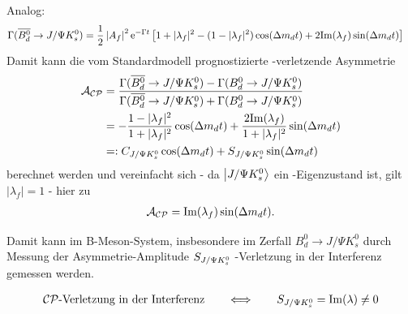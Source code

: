 Analog:
\begin{align}
\Gamma (\text{$\overline{B_d^0}$} \rightarrow J/\Psi K_s^0) &= \frac{1}{2} \left|A_f\right|^2\mathrm{e}^{-\Gamma t} \left[1+|\lambda_f|^2 -(1-|\lambda_f|^2)\cos(\Delta m_d t) + 2\mathrm{Im}(\lambda_f)\sin(\Delta m_d t)\right] \label{eq:bdbar}
\end{align}
Damit kann die vom Standardmodell prognostizierte \CP-verletzende Asymmetrie 
\begin{align}
\mathcal{A}_{\text{$\mathcal{CP}$}} &= \frac{\Gamma (\text{$\overline{B_d^0}$} \rightarrow J/\Psi K_s^0) - \Gamma (\text{$B_d^0$} \rightarrow J/\Psi K_s^0)}{\Gamma (\text{$\overline{B_d^0}$} \rightarrow J/\Psi K_s^0) + \Gamma (\text{$B_d^0$} \rightarrow J/\Psi K_s^0)} \\
&= -\frac{1-|\lambda_f|^2}{1+|\lambda_f|^2}\cos(\Delta m_d t) + \frac{2\mathrm{Im}(\lambda_f)}{1+|\lambda_f|^2}\sin(\Delta m_d t) \\
&=: C_{J/\Psi K_s^0} \cos(\Delta m_d t) + S_{J/\Psi K_s^0} \sin(\Delta m_d t) \label{eq:cp_asymm}
\end{align}
berechnet werden und vereinfacht sich - da $\Ket{J/\Psi K_s^0}$ ein \CP-Eigenzustand ist, gilt $|\lambda_f| = 1$ - hier zu
\begin{align}
\mathcal{A}_{\text{$\mathcal{CP}$}} = \mathrm{Im}(\lambda_f)\sin(\Delta m_d t) .
\end{align}

Damit kann im B-Meson-System, insbesondere im Zerfall $B_d^0 \rightarrow J/\Psi K_s^0$ durch Messung der Asymmetrie-Amplitude $S_{J/\Psi K_s^0}$ \CP-Verletzung in der Interferenz gemessen werden.

\begin{align}
\text{$\mathcal{CP}$-Verletzung in der Interferenz} \qquad \Longleftrightarrow \qquad S_{J/\Psi K_s^0} = \mathrm{Im}(\lambda)\neq 0
\end{align}

